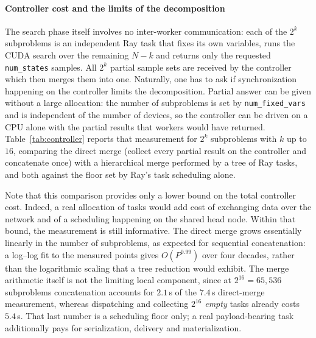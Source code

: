 \documentclass[preprint,12pt,a4paper]{elsarticle}
\begin{document}
\paragraph{Controller cost and the limits of the decomposition}
The search phase itself involves no inter-worker communication: each of the
$2^{k}$ subproblems is an independent Ray task that fixes its own variables, runs
the CUDA search over the remaining $N-k$ and returns only the requested
\texttt{num\_states} samples. All $2^{k}$ partial sample sets are received by the controller
which then merges them into one. Naturally, one has to ask if synchronization happening
on the controller limits the decomposition. Partial answer can be
given without a large allocation: the number of subproblems is set by
\texttt{num\_fixed\_vars} and is independent of the number of devices, so the controller can be
driven on a CPU alone with the partial results that workers would have returned.
Table~\ref{tab:controller} reports that measurement for $2^{k}$ subproblems with $k$ up to
$16$, comparing the direct merge (collect every partial result on the controller and
concatenate once) with a hierarchical merge performed by a tree of Ray tasks, and both
against the floor set by Ray's task scheduling alone.

Note that this comparison provides only a lower bound on the total controller cost.
Indeed, a real allocation of tasks would add cost of exchanging data over the network and
of a scheduling happening on the shared head node. Within that bound, the measurement is
still informative. The direct merge grows essentially linearly in the number of subproblems,
as expected for sequential concatenation: a log--log fit to the measured points gives
$O(P^{0.99})$ over four decades, rather than the logarithmic scaling that a tree reduction
would exhibit. The merge arithmetic itself is not the limiting local component, since at
$2^{16}=65{,}536$ subproblems concatenation accounts for $2.1$\,s of the $7.4$\,s direct-merge
measurement, whereas dispatching and collecting $2^{16}$ \emph{empty} tasks already costs
$5.4$\,s. That last number is a scheduling floor only; a real payload-bearing task
additionally pays for serialization, delivery and materialization.
\end{document}
